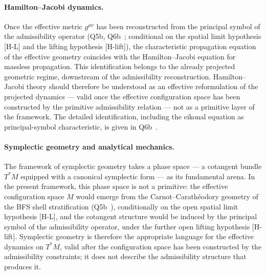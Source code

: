\documentclass[11pt,a4paper]{article}
\begin{document}
  \paragraph{Hamilton--Jacobi dynamics.}
    Once the effective metric $g^{\mu\nu}$ has been reconstructed from the principal
    symbol of the admissibility operator (Q5b, Q6b~\cite{Beau2026q5b,Beau2026q6b};
    conditional on the spatial limit hypothesis [H-L] and the lifting hypothesis [H-lift]),
    the characteristic propagation equation of the effective geometry coincides with the
    Hamilton--Jacobi equation for massless propagation.
    This identification belongs to the already projected geometric regime, downstream of
    the admissibility reconstruction.
    Hamilton--Jacobi theory should therefore be understood as an effective reformulation
    of the projected dynamics — valid once the effective configuration space has been
    constructed by the primitive admissibility relation — not as a primitive layer of the
    framework.
    The detailed identification, including the eikonal equation as principal-symbol
    characteristic, is given in Q6b~\cite{Beau2026q6b}.

  \paragraph{Symplectic geometry and analytical mechanics.}
    The framework of symplectic geometry takes a phase space — a cotangent bundle
    $T^*M$ equipped with a canonical symplectic form — as its fundamental arena.
    In the present framework, this phase space is not a primitive: the effective
    configuration space $M$ would emerge from the Carnot--Carath\'eodory geometry of the
    BFS shell stratification (Q5b~\cite{Beau2026q5b}), conditionally on the open spatial limit hypothesis [H-L],
    and the cotangent structure would be induced by the principal symbol of the admissibility operator,
    under the further open lifting hypothesis [H-lift].
    Symplectic geometry is therefore the appropriate language for the effective dynamics
    on $T^*M$, valid after the configuration space has been constructed by the
    admissibility constraints; it does not describe the admissibility structure that
    produces it.
\end{document}
